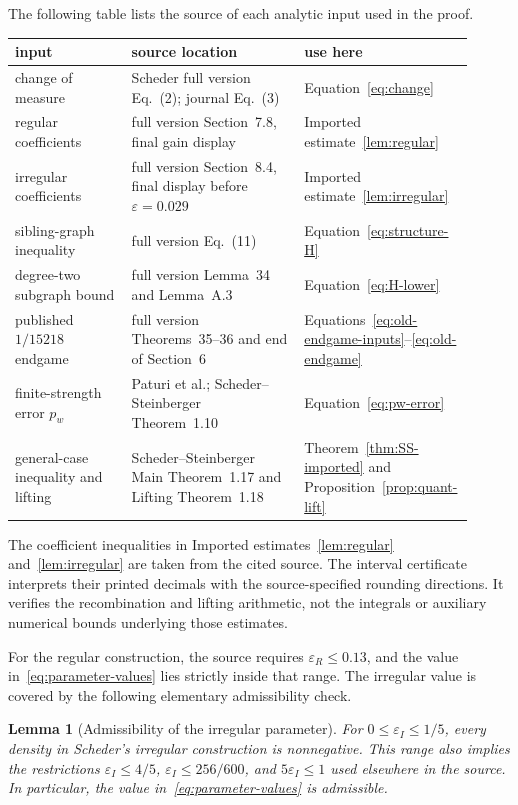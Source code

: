 \documentclass[11pt]{article}
\newtheorem{lemma}[theorem]{Lemma}
\newcommand{\eps}{\varepsilon}
\begin{document}
The following table lists the source of each analytic input used in the proof.
\begin{center}
\small
\renewcommand{\arraystretch}{1.12}
\begin{tabular}{@{}>{\raggedright\arraybackslash}p{0.25\linewidth}>{\raggedright\arraybackslash}p{0.37\linewidth}>{\raggedright\arraybackslash}p{0.29\linewidth}@{}}
\toprule
input & source location & use here\\
\midrule
change of measure & Scheder full version Eq.~(2); journal Eq.~(3) & Equation~\eqref{eq:change}\\
regular coefficients & full version Section~7.8, final gain display & Imported estimate~\ref{lem:regular}\\
irregular coefficients & full version Section~8.4, final display before $\eps=0.029$ & Imported estimate~\ref{lem:irregular}\\
sibling-graph inequality & full version Eq.~(11) & Equation~\eqref{eq:structure-H}\\
degree-two subgraph bound & full version Lemma~34 and Lemma~A.3 & Equation~\eqref{eq:H-lower}\\
published $1/15218$ endgame & full version Theorems~35--36 and end of Section~6 & Equations~\eqref{eq:old-endgame-inputs}--\eqref{eq:old-endgame}\\
finite-strength error $p_w$ & Paturi et al.; Scheder--Steinberger Theorem~1.10 & Equation~\eqref{eq:pw-error}\\
general-case inequality and lifting & Scheder--Steinberger Main Theorem~1.17 and Lifting Theorem~1.18 & Theorem~\ref{thm:SS-imported} and Proposition~\ref{prop:quant-lift}\\
\bottomrule
\end{tabular}
\end{center}

The coefficient inequalities in Imported estimates~\ref{lem:regular} and~\ref{lem:irregular} are taken from the cited source.  The interval certificate interprets their printed decimals with the source-specified rounding directions.  It verifies the recombination and lifting arithmetic, not the integrals or auxiliary numerical bounds underlying those estimates.

For the regular construction, the source requires $\eps_R\le0.13$, and the value in~\eqref{eq:parameter-values} lies strictly inside that range.  The irregular value is covered by the following elementary admissibility check.

\begin{lemma}[Admissibility of the irregular parameter]\label{lem:epsI-valid}
For $0\le\eps_I\le1/5$, every density in Scheder's irregular construction is nonnegative.  This range also implies the restrictions $\eps_I\le4/5$, $\eps_I\le256/600$, and $5\eps_I\le1$ used elsewhere in the source.  In particular, the value in~\eqref{eq:parameter-values} is admissible.
\end{lemma}
\end{document}
